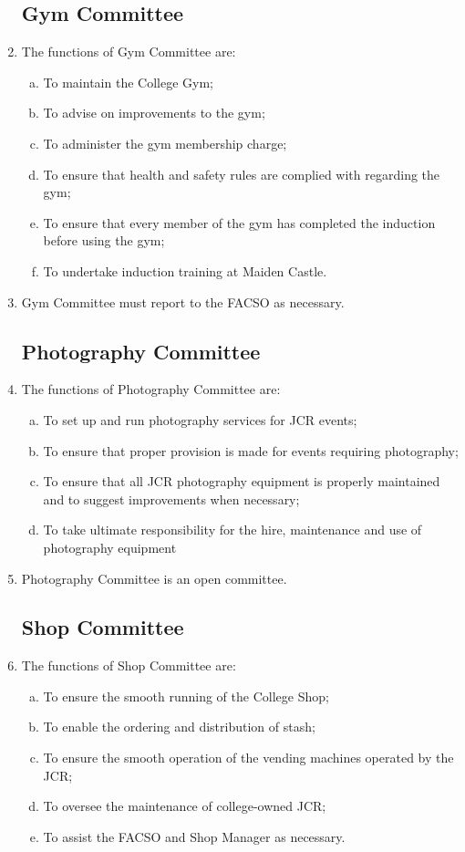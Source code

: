 \documentclass[12pt]{article}
\begin{document}
\begin{enumerate}
    \subsection{Gym Committee}
    \item The functions of Gym Committee are:
    \begin{enumerate}[(a)]
        \item To maintain the College Gym;
        \item To advise on improvements to the gym;
        \item To administer the gym membership charge;
        \item To ensure that health and safety rules are complied with regarding the gym;
        \item To ensure that every member of the gym has completed the induction before using the gym;
        \item To undertake induction training at Maiden Castle.
    \end{enumerate}
    \item Gym Committee must report to the FACSO as necessary.
    \subsection{Photography Committee}
    \item The functions of Photography Committee are:
    \begin{enumerate}[(a)]
        \item To set up and run photography services for JCR events;
        \item To ensure that proper provision is made for events requiring photography;
        \item To ensure that all JCR photography equipment is properly maintained and to suggest improvements when necessary;
        \item To take ultimate responsibility for the hire, maintenance and use of photography equipment
    \end{enumerate}
    \item Photography Committee is an open committee.
    \subsection{Shop Committee}
    \item The functions of Shop Committee are:
    \begin{enumerate}[(a)]
        \item To ensure the smooth running of the College Shop;
        \item To enable the ordering and distribution of stash;
        \item To ensure the smooth operation of the vending machines operated by the JCR;
        \item To oversee the maintenance of college-owned JCR;
        \item To assist the FACSO and Shop Manager as necessary.
    \end{enumerate}

\end{enumerate}
\end{document}
